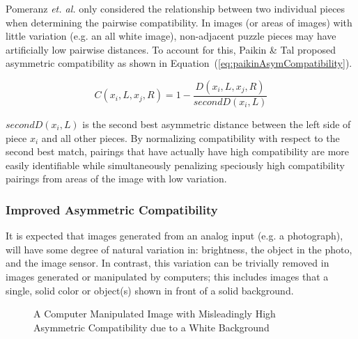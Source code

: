 \documentclass{report}
\def\eref#1{(\ref{#1})}
\begin{document}
Pomeranz \textit{et. al.} only considered the relationship between two individual pieces when determining the pairwise compatibility.  In images (or areas of images) with little variation (e.g. an all white image), non-adjacent puzzle pieces may have artificially low pairwise distances.  To account for this, Paikin \& Tal proposed asymmetric compatibility as shown in Equation~\eref{eq:paikinAsymCompatibility}.

\begin{equation} \label{eq:paikinAsymCompatibility}
C(x_i,L,x_j,R) = 1 - \frac{D(x_i,L,x_j,R)}{secondD(x_i,L)}
\end{equation}

\noindent
$secondD(x_i,L)$ is the second best asymmetric distance between the left side of piece $x_i$ and all other pieces.  By normalizing compatibility with respect to the second best match, pairings that have actually have high compatibility are more easily identifiable while simultaneously penalizing speciously high compatibility pairings from areas of the image with low variation.

\subsubsection{Improved Asymmetric Compatibility}\label{sec:hammoudehPairwiseAffinity}

It is expected that images generated from an analog input (e.g. a photograph), will have some degree of natural variation in: brightness, the object in the photo, and the image sensor.  In contrast, this variation can be trivially removed in images generated or manipulated by computers; this includes images that a single, solid color or object(s) shown in front of a solid background.

\begin{figure}
\centering
{}
\caption{A Computer Manipulated Image with Misleadingly High Asymmetric Compatibility due to a White Background}
\label{fig:objectWhiteBackground}
\end{figure}
\end{document}
